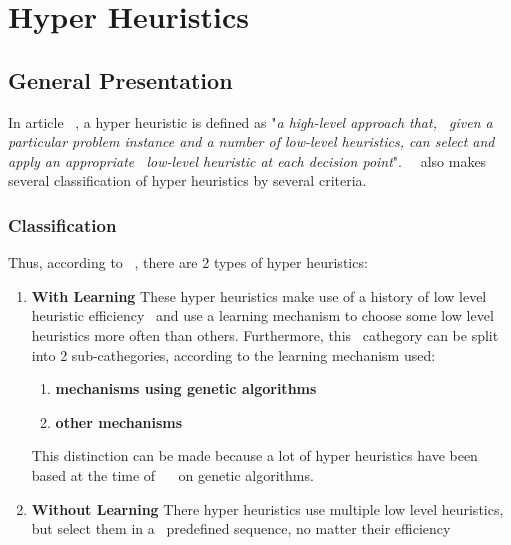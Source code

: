 \section{}


\section{Hyper Heuristics}
\label{sec:research-hh}

\subsection{General Presentation}
\label{subsec:research-general-hh}

In article ~\cite{MetaHeuristicsHandbook}, a hyper heuristic is defined as "\textit{a high-level approach that, \
given a particular problem instance and a number of low-level heuristics, can select and apply an appropriate \
low-level heuristic at each decision point}".\
~\cite{MetaHeuristicsHandbook} also makes several classification of hyper heuristics by several criteria.

\subsubsection{Classification}
\label{subsubsec:research-hh-classification}

Thus, according to ~\cite{soubeiga}, there are 2 types of hyper heuristics:
\begin{enumerate}
    \item \textbf{With Learning} These hyper heuristics make use of a history of low level heuristic efficiency \
and use a learning mechanism to choose some low level heuristics more often than others. Furthermore, this \
cathegory can be split into 2 sub-cathegories, according to the learning mechanism used:
    \begin{enumerate}
        \item \textbf{mechanisms using genetic algorithms}
        \item \textbf{other mechanisms}
    \end{enumerate}
    This distinction can be made because a lot of hyper heuristics have been based at the time of ~\cite{soubeiga} \
on genetic algorithms.
    \item \textbf{Without Learning} There hyper heuristics use multiple low level heuristics, but select them in a \
predefined sequence, no matter their efficiency
\end{enumerate}

